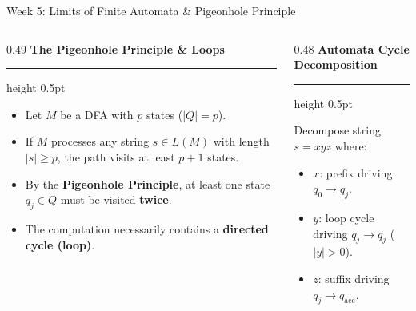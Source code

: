 \documentclass[aspectratio=169, 10pt]{beamer}
\newcommand{\colheader}[1]{%
  {\noindent\footnotesize\bfseries\color{gimpanavy}#1}%
  \vspace{0.03cm}%
  {\color{gimpanavy!30}\hrule height 0.5pt}%
  \vspace{0.08cm}%
}
\begin{document}
\begin{frame}{Week 5: Limits of Finite Automata \& Pigeonhole Principle}
  \begin{columns}[T, onlytextwidth]
    \begin{column}{0.49\textwidth}
      \colheader{The Pigeonhole Principle \& Loops}
      \begin{tcolorbox}[conceptcard]
        \begin{itemize}\setlength{\itemsep}{2.5pt}\footnotesize
          \item Let $M$ be a DFA with $p$ states ($|Q| = p$).
          \item If $M$ processes any string $s \in L(M)$ with length $|s| \ge p$, the path visits at least $p + 1$ states.
          \item By the \textbf{Pigeonhole Principle}, at least one state $q_j \in Q$ must be visited \textbf{twice}.
          \item The computation necessarily contains a \textbf{directed cycle (loop)}.
        \end{itemize}
      \end{tcolorbox}
    \end{column}

    \hfill

    \begin{column}{0.48\textwidth}
      \colheader{Automata Cycle Decomposition}
      \vspace{0.05cm}
      \begin{center}
      \end{center}
      \vspace{-0.15cm}
      \footnotesize
      Decompose string $s = xyz$ where:
      \begin{itemize}\setlength{\itemsep}{1.5pt}\scriptsize
        \item $x$: prefix driving $q_0 \to q_j$.
        \item $y$: loop cycle driving $q_j \to q_j$ ($|y| > 0$).
        \item $z$: suffix driving $q_j \to q_{\text{acc}}$.
      \end{itemize}
    \end{column}
  \end{columns}


\end{frame}
\end{document}

